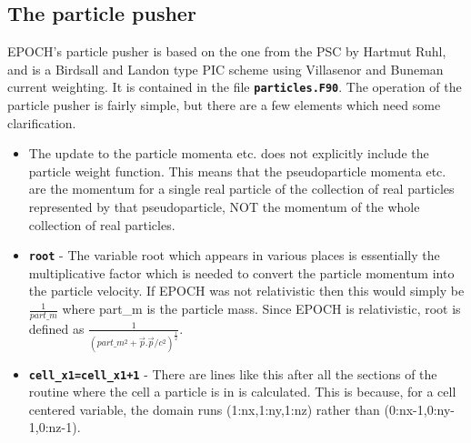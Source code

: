 \documentclass[12pt]{article}
\newcommand{\inlinecode}[1]{{\color{warwickred} \bf\texttt{#1}}}
\newcommand{\nEPOCH}{{\color{warwickdark}\fontfamily{phv}\selectfont EPOCH}}
\newcommand{\EPOCH}{{\nEPOCH} }
\begin{document}
\subsection{The particle pusher}
EPOCH's particle pusher is based on the one from the PSC by Hartmut Ruhl, and
is a Birdsall and Landon type PIC scheme using Villasenor and Buneman current
weighting. It is contained in the file \inlinecode{particles.F90}. The
operation of the particle pusher is fairly simple, but there are a few elements
which need some clarification.
\begin{itemize}
\item The update to the particle momenta etc. does not explicitly include the
  particle weight function. This means that the pseudoparticle momenta etc. are
  the momentum for a single real particle of the collection of real particles
  represented by that pseudoparticle, NOT the momentum of the whole collection
  of real particles.
\item \inlinecode{root} - The variable root which appears in various places is
  essentially the multiplicative factor which is needed to convert the particle
  momentum into the particle velocity. If \EPOCH was not relativistic then this
  would simply be $\frac{1}{part\_m}$ where part\_m is the particle mass. Since
  \EPOCH is relativistic, root is defined as $\frac{1}{(part\_m^2 +
    \vec{p}.\vec{p}/c^2)^\frac{1}{2}}$.
\item \inlinecode{cell\_x1=cell\_x1+1} - There are lines like this after all
  the sections of the routine where the cell a particle is in is
  calculated. This is because, for a cell centered variable, the domain runs
  (1:nx,1:ny,1:nz) rather than (0:nx-1,0:ny-1,0:nz-1).
\end{itemize}
\end{document}

